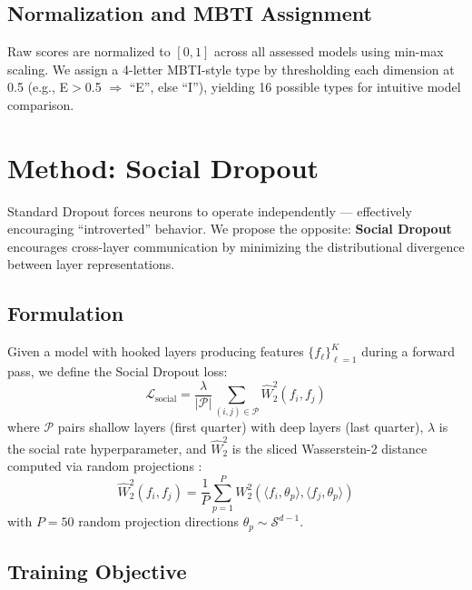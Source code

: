 \documentclass[letterpaper]{article}
\begin{document}
\subsection{Normalization and MBTI Assignment}

Raw scores are normalized to $[0, 1]$ across all assessed models using min-max scaling. We assign a 4-letter MBTI-style type by thresholding each dimension at 0.5 (e.g., E$>$0.5 $\Rightarrow$ ``E'', else ``I''), yielding 16 possible types for intuitive model comparison.

\section{Method: Social Dropout}
\label{sec:social_dropout}

Standard Dropout forces neurons to operate independently --- effectively encouraging ``introverted'' behavior. We propose the opposite: \textbf{Social Dropout} encourages cross-layer communication by minimizing the distributional divergence between layer representations.

\subsection{Formulation}

Given a model with hooked layers producing features $\{f_\ell\}_{\ell=1}^K$ during a forward pass, we define the Social Dropout loss:
\begin{equation}
    \mathcal{L}_{\text{social}} = \frac{\lambda}{|\mathcal{P}|} \sum_{(i,j) \in \mathcal{P}} \widehat{W}_2^2(f_i, f_j)
    \label{eq:social_loss}
\end{equation}
where $\mathcal{P}$ pairs shallow layers (first quarter) with deep layers (last quarter), $\lambda$ is the social rate hyperparameter, and $\widehat{W}_2^2$ is the sliced Wasserstein-2 distance computed via random projections \citep{bonneel2015sliced}:
\begin{equation}
    \widehat{W}_2^2(f_i, f_j) = \frac{1}{P} \sum_{p=1}^P W_2^2\!\left(\langle f_i, \theta_p \rangle, \langle f_j, \theta_p \rangle\right)
\end{equation}
with $P=50$ random projection directions $\theta_p \sim \mathcal{S}^{d-1}$.

\subsection{Training Objective}
\end{document}
